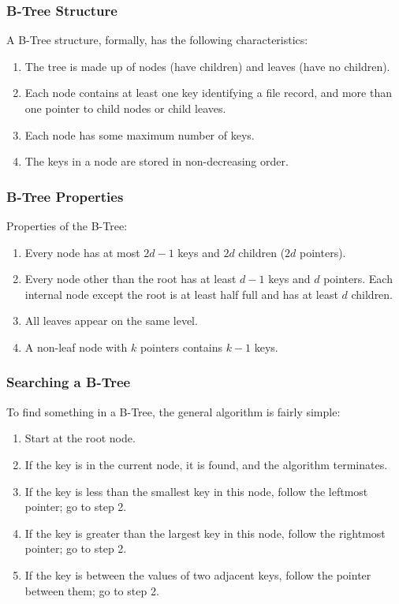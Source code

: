 \begin{frame}
\frametitle{B-Tree Structure}

A B-Tree structure, formally, has the following characteristics:

\begin{enumerate}
	\item The tree is made up of nodes (have children) and leaves (have no children).
	\item Each node contains at least one key identifying a file record, and more than one pointer to child nodes or child leaves.
	\item Each node has some maximum number of keys.
	\item The keys in a node are stored in non-decreasing order.
\end{enumerate}

\end{frame}



\begin{frame}
\frametitle{B-Tree Properties}

Properties of the B-Tree:

\begin{enumerate}
	\item Every node has at most $2d-1$ keys and $2d$ children ($2d$ pointers).
	\item Every node other than the root has at least $d-1$ keys and $d$ pointers. Each internal node except the root is at least half full and has at least $d$ children.
	\item All leaves appear on the same level.
	\item A non-leaf node with $k$ pointers contains $k-1$ keys.
\end{enumerate}

\end{frame}

\begin{frame}
\frametitle{Searching a B-Tree}

To find something in a B-Tree, the general algorithm is fairly simple:

\begin{enumerate}
	\item Start at the root node. 
	\item If the key is in the current node, it is found, and the algorithm terminates.
	\item If the key is less than the smallest key in this node, follow the leftmost pointer; go to step 2.
	\item If the key is greater than the largest key in this node, follow the rightmost pointer; go to step 2.
	\item If the key is between the values of two adjacent keys, follow the pointer between them; go to step 2.
\end{enumerate}



\end{frame}

